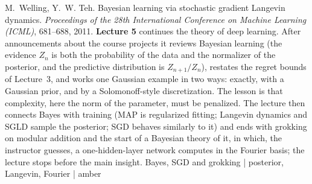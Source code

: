  M.~Welling, Y.~W. Teh. Bayesian learning via stochastic gradient Langevin dynamics. \emph{Proceedings of the 28th International Conference on Machine Learning (ICML)}, 681--688, 2011.
\textbf{Lecture 5} continues the theory of deep learning. After announcements about the course projects it reviews Bayesian learning (the evidence $Z_n$ is both the probability of the data and the normalizer of the posterior, and the predictive distribution is $Z_{n+1}/Z_n$), restates the regret bounds of Lecture~3, and works one Gaussian example in two ways: exactly, with a Gaussian prior, and by a Solomonoff-style discretization. The lesson is that complexity, here the norm of the parameter, must be penalized. The lecture then connects Bayes with training (MAP is regularized fitting; Langevin dynamics and SGLD sample the posterior; SGD behaves similarly to it) and ends with grokking on modular addition and the start of a Bayesian theory of it, in which, the instructor guesses, a one-hidden-layer network computes in the Fourier basis; the lecture stops before the main insight.
Bayes, SGD and grokking | posterior, Langevin, Fourier | amber
